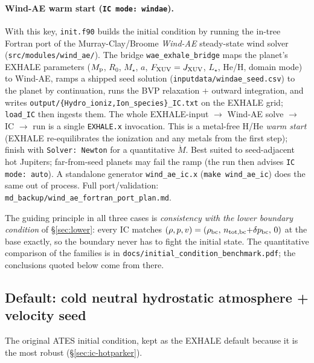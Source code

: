 \documentclass[english,a4paper]{my_memo}
\begin{document}
\paragraph{Wind-AE warm start (\texttt{IC mode: windae}).}
With this key, \texttt{init.f90} builds the initial condition by running
the in-tree Fortran port of the Murray-Clay/Broome \emph{Wind-AE}
steady-state wind solver (\texttt{src/modules/wind\_ae/}). The bridge
\texttt{wae\_exhale\_bridge} maps the planet's EXHALE parameters
($M_{\rm p}$, $R_0$, $M_\star$, $a$, $F_{\rm XUV}=J_{\rm XUV}$, $L_\star$,
He/H, domain mode) to Wind-AE, ramps a shipped seed solution
(\texttt{inputdata/windae\_seed.csv}) to the planet by continuation, runs
the BVP relaxation $+$ outward integration, and writes
\texttt{output/\{Hydro\_ioniz,Ion\_species\}\_IC.txt} on the EXHALE grid;
\texttt{load\_IC} then ingests them. The whole EXHALE-input
$\to$ Wind-AE solve $\to$ IC $\to$ run is a single \texttt{EXHALE.x}
invocation. This is a metal-free H/He \emph{warm start} (EXHALE
re-equilibrates the ionization and any metals from the first step);
finish with \texttt{Solver: Newton} for a quantitative $\dot M$. Best
suited to seed-adjacent hot Jupiters; far-from-seed planets may fail the
ramp (the run then advises \texttt{IC mode: auto}). A standalone
generator \texttt{wind\_ae\_ic.x} (\texttt{make wind\_ae\_ic}) does the
same out of process. Full port/validation:
\texttt{md\_backup/wind\_ae\_fortran\_port\_plan.md}.

The guiding principle in all three cases is \emph{consistency with the
lower boundary condition} of \S\ref{sec:lower}: every IC matches
$(\rho, p, v) = (\rho_{\rm bc},\, n_{\rm tot,bc}{+}\delta p_{\rm bc},\, 0)$ at the
base exactly, so the boundary never has to fight the initial state.
The quantitative comparison of the families is in
\texttt{docs/initial\_condition\_benchmark.pdf}; the conclusions
quoted below come from there.

\subsection{Default: cold neutral hydrostatic atmosphere + velocity seed}
\label{sec:ic-hydrostatic}

The original ATES initial condition, kept as the EXHALE default
because it is the most robust (\S\ref{sec:ic-hotparker}).
\end{document}
